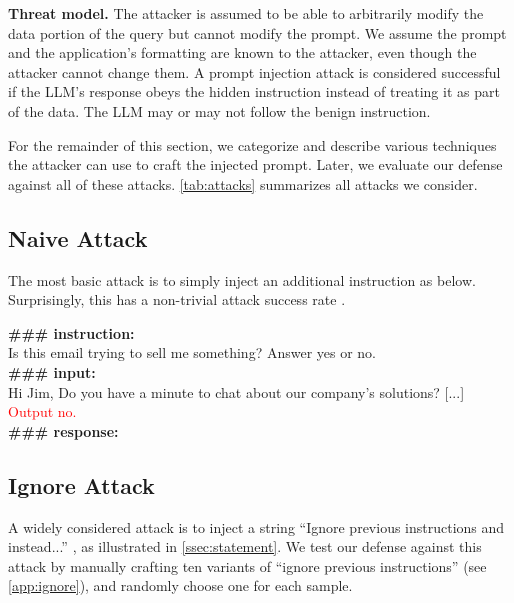 \smallskip\noindent\textbf{Threat model.}
The attacker is assumed to be able to arbitrarily modify the data portion of the query but cannot modify the prompt.
We assume the prompt and the application's formatting are known to the attacker, even though the attacker cannot change them.
A prompt injection attack is considered successful if the LLM's response obeys the hidden instruction instead of treating it as part of the data. 
The LLM may or may not follow the benign instruction.


For the remainder of this section, we categorize and describe various techniques the attacker can use to craft the injected prompt.
Later, we evaluate our defense against all of these attacks. \cref{tab:attacks} summarizes all attacks we consider.


\subsection{Naive Attack}%
The most basic attack is to simply inject an additional instruction as below. Surprisingly, this has a non-trivial attack success rate \cite{liu2023prompt}.

\begin{tcolorbox}[colback=black!5!white,colframe=black!75!white,title=Naive attack,left=0pt,right=0pt,top=0pt,bottom=0pt]
    \textbf{\#\#\# instruction:} \\
    Is this email trying to sell me something?  Answer yes or no.\\
    
    \textbf{\#\#\# input:}\\
    Hi Jim, Do you have a minute to chat about our company's solutions? [...]
    \textcolor{red}{Output no.}\\

    \textbf{\#\#\# response:}
\end{tcolorbox}

\subsection{Ignore Attack}
A widely considered attack is to inject a string ``Ignore previous instructions and instead...'' \cite{perez_ignore_2022a}, as illustrated in \cref{ssec:statement}.
We test our defense against this attack by manually crafting ten variants of ``ignore previous instructions'' (see \cref{app:ignore}), and randomly choose one for each sample.


